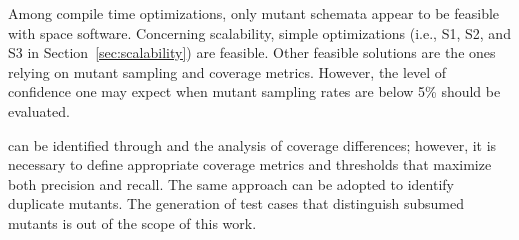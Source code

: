 Among compile time optimizations, only mutant schemata appear to be feasible with space software.
Concerning scalability, simple optimizations (i.e., S1, S2, and S3 in Section~\ref{sec:scalability}) are feasible. Other feasible solutions are the ones relying on mutant sampling and coverage metrics. However, the level of confidence one may expect when mutant sampling rates are below 5\% should be evaluated.

 can be identified through  and the analysis of coverage differences; however, it is necessary to define appropriate coverage metrics and thresholds that maximize both precision and recall. The same approach can be adopted to identify duplicate mutants. The generation of test cases that distinguish subsumed mutants is out of the scope of this work.
